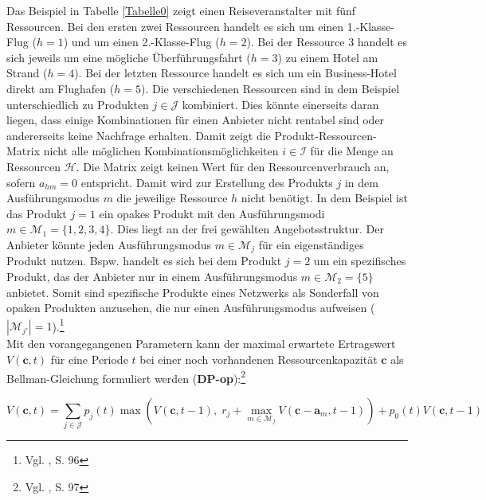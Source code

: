 Das Beispiel in Tabelle \ref{Tabelle0} zeigt einen Reiseveranstalter mit fünf Ressourcen. Bei den ersten zwei Ressourcen handelt es sich um einen 1.-Klasse-Flug ($h=1$) und um einen 2.-Klasse-Flug ($h=2$). Bei der Ressource $3$ handelt es sich jeweils um eine mögliche Überführungsfahrt ($h=3$) zu einem Hotel am Strand ($h=4$). Bei der letzten Ressource handelt es sich um ein Business-Hotel direkt am Flughafen ($h=5$). Die verschiedenen Ressourcen sind in dem Beispiel unterschiedlich zu Produkten $j\in\mathcal{J}$ kombiniert. Dies könnte einerseits daran liegen, dass einige Kombinationen für einen Anbieter nicht rentabel sind oder andererseits keine Nachfrage erhalten. Damit zeigt die Produkt-Ressourcen-Matrix nicht alle möglichen Kombinationsmöglichkeiten $i\in\mathcal{I}$ für die Menge an Ressourcen $\mathcal{H}$. Die Matrix zeigt keinen Wert für den Ressourcenverbrauch an, sofern $a_{hm}=0$ entspricht. Damit wird zur Erstellung des Produkts $j$ in dem Ausführungsmodus $m$ die jeweilige Ressource $h$ nicht benötigt. In dem Beispiel ist das Produkt $j=1$ ein opakes Produkt mit den Ausführungsmodi $m\in\mathcal{M}_{1}=\{1,2,3,4\}$. Dies liegt an der frei gewählten Angebotsstruktur. Der Anbieter könnte jeden Ausführungsmodus $m\in\mathcal{M}_{j}$ für ein eigenständiges Produkt nutzen. Bspw. handelt es sich bei dem Produkt $j=2$ um ein spezifisches Produkt, das der Anbieter nur in einem Ausführungsmodus $m\in\mathcal{M}_{2}=\{5\}$ anbietet. Somit sind spezifische Produkte eines Netzwerks als Sonderfall von opaken Produkten anzusehen, die nur einen Ausführungsmodus aufweisen ($|\mathcal{M}_{j'}|=1$).\footnote{Vgl. \cite{gonsch2013using}, S. 96}\\

Mit den vorangegangenen Parametern kann der maximal erwartete Ertragswert $V(\textbf{c},t)$ für eine Periode $t$ bei einer noch vorhandenen Ressourcenkapazität $\textbf{c}$ als Bellman-Gleichung formuliert werden (\textbf{DP-op}):\footnote{Vgl. \cite{gonsch2013using}, S. 97}

\begin{equation}\label{DPop}
V(\textbf{c},t)=\sum_{j\in\mathcal{J}}p_{j}(t)\max\left( V(\textbf{c},t-1),\; r_{j}+\max_{m\in\mathcal{M}_{j}}V(\textbf{c}-\textbf{a}_{m},t-1)\right)+p_{0}(t)V(\textbf{c},t-1)
\end{equation}

